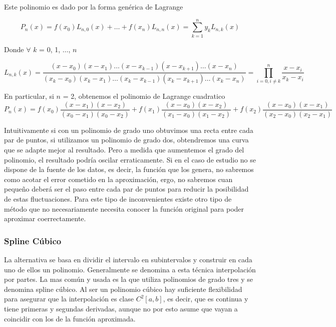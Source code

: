 Este polinomio es dado por la forma genérica de Lagrange

\begin{equation}
	P_n(x) = f(x_0)L_{n, 0}(x) + \dots + f(x_n)L_{n,n}(x) = \sum_{k=1}^{n} y_kL_{n,k}(x) 
\end{equation}

Donde $\forall$ $k$ = 0, 1, $\dots$, $n$

\begin{equation}
	L_{n,k}(x) = \dfrac{(x - x_0)(x - x_1)\dots(x - x_{k-1})(x - x_{k+1})\dots(x - x_n)}{(x_k - x_0)(x_k - x_1)\dots(x_k - x_{k-1})(x_k - x_{k+1})\dots(x_k - x_n)} = \prod_{i=0, i \neq k}^{n} \dfrac{x - x_i}{x_k - x_i}
\end{equation}

En particular, si $n$ = 2, obtenemos el polinomio de Lagrange cuadratico
\begin{equation}
	P_n(x) = f(x_0)\dfrac{(x - x_1)(x - x_2)}{(x_0 - x_1)(x_0 - x_2)} + f(x_1)\dfrac{(x - x_0)(x - x_2)}{(x_1 - x_0)(x_1 - x_2)} + f(x_2)\dfrac{(x - x_0)(x - x_1)}{(x_2 - x_0)(x_2 - x_1)} 
\end{equation}

Intuitivamente si con un polinomio de grado uno obtuvimos una recta entre cada par de puntos, si utilizamos un polinomio de grado dos, obtendremos una curva que se adapte mejor al resultado. Pero a medida que aumentemos el grado del polinomio, el resultado podría oscilar erraticamente. Si en el caso de estudio no se dispone de la fuente de los datos, es decir, la función que los genera, no sabremos como acotar el error cometido en la aproximación, ergo, no sabremos cuan pequeño deberá ser el paso entre cada par de puntos para reducir la posibilidad de estas fluctuaciones. 
Para este tipo de inconvenientes existe otro tipo de método que no necesariamente necesita conocer la función original para poder aproximar coerrectamente.

\subsubsection{Spline Cúbico}

La alternativa se basa en dividir el intervalo en subintervalos y construir en cada uno de ellos un polinomio. Generalmente se denomina a esta técnica interpolación por partes. La mas común y usada es la que utiliza polinomios de grado tres y se denomina spline cúbico. 
Al ser un polinomio cúbico hay suficiente flexibilidad para asegurar que la interpolación es clase $C^{2}[a, b]$, es decir, que es continua y tiene primeras y segundas derivadas, aunque no por esto asume que vayan a coincidir con los de la función aproximada.

